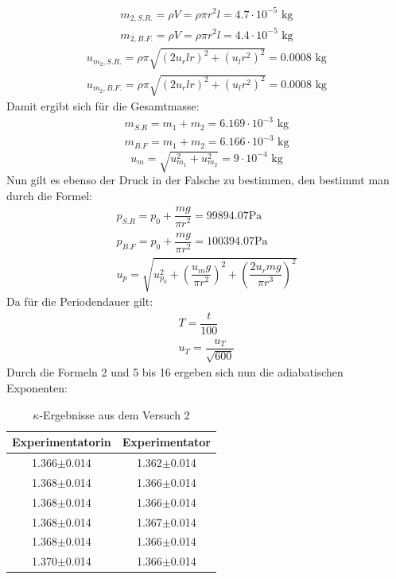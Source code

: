 \documentclass[bibliography=totocnumbered]{scrartcl}
\begin{document}
	\begin{align}\label{eq: m2}
		m_{2,S.R.}=\rho V=\rho \pi r^{2}l=4.7\cdot 10^{-5} \text{ kg}\\
		m_{2,B.F.}=\rho V=\rho \pi r^{2}l=4.4 \cdot10^{-5} \text{ kg}
	\end{align}
\begin{align}\label{eq: Unsicherheit von m2}
	u_{m_{2},S.R.}=\rho \pi \sqrt{ \left(2u_{r}lr\right)^{2}+\left(u_{l}r^{2}\right)^{2}}=0.0008\text{ kg}\\
	u_{m_{2},B.F.}=\rho \pi \sqrt{ \left(2u_{r}lr\right)^{2}+\left(u_{l}r^{2}\right)^{2}}=0.0008\text{ kg}
\end{align}
Damit ergibt sich für die Gesamtmasse:
\begin{align}\label{eq: Gesamtmasse}
	m_{S.R}=m_{1}+m_{2}=6.169\cdot 10 ^{-3}\text{ kg}\\
	m_{B.F}=m_{1}+m_{2}=6.166\cdot 10 ^{-3}\text{ kg}
\end{align}
\begin{equation}\label{eq: Unischerheit von Gesamtmasse}
	u_{m}=\sqrt{u_{m_{1}}^{2}+u_{m_{2}}^{2}}=9\cdot 10 ^{-4}\text{ kg}
\end{equation}
	Nun gilt es ebenso der Druck in der Falsche zu bestimmen, den bestimmt man durch die Formel:
	\begin{align}
		p_{S.R}=p_{0}+\dfrac{mg}{\pi r^{2}}=99894.07 \text{Pa}\\
		p_{B.F}=p_{0}+\dfrac{mg}{\pi r^{2}}=100394.07 \text{Pa}\\
		u_{p}=\sqrt{u_{p_{0}}^{2}+\left(\dfrac{u_{m}g}{\pi r^{2}}\right)^{2}+\left(\dfrac{2u_{r}mg}{\pi r^{3}}\right)^{2}}
	\end{align}
	Da für die Periodendauer gilt:
	\begin{align}
		T=\dfrac{t}{100}\\
		u_{T}=\dfrac{u_{T}}{\sqrt{600}}
	\end{align}
	Durch die Formeln 2 und 5 bis 16 ergeben sich nun die adiabatischen Exponenten:
	
	\begin{table}[ht!]
		\centering
		\caption{$\kappa$-Ergebnisse aus dem Versuch 2}
		\begin{tabular}{|c|c|}
			\hline
			Experimentatorin  & Experimentator \\
			\hline
			1.366$ \pm $0.014& 1.362$ \pm $0.014 \\
			\hline
			1.368$ \pm $0.014 & 1.366$ \pm $0.014 \\
			\hline
			1.368$ \pm $0.014 & 1.366$ \pm $0.014 \\
			\hline
			1.368$ \pm $0.014 & 1.367$ \pm $0.014 \\
			\hline
			1.368$ \pm $0.014 & 1.366$ \pm $0.014 \\
			\hline
			1.370$ \pm $0.014 & 1.366$ \pm $0.014 \\
			\hline
		\end{tabular}
		\label{tab: kappa V2}
	\end{table}
	
\end{document}
